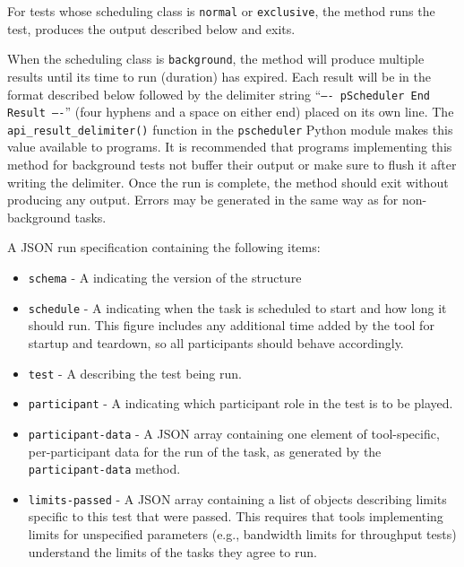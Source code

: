 \documentclass[10pt,titlepage]{article}
\begin{document}
For tests whose scheduling class is {\tt normal} or {\tt exclusive},
the method runs the test, produces the output described below and exits.

When the scheduling class is {\tt background}, the method will produce
multiple results until its time to run (duration) has expired.  Each
result will be in the format described below followed by the delimiter
string ``{\tt ---- pScheduler End Result ----}'' (four hyphens and a
space on either end) placed on its own line.  The {\tt
  api_result_delimiter()} function in the {\tt pscheduler} Python
module makes this value available to programs.  It is recommended that
programs implementing this method for background tests not buffer
their output or make sure to flush it after writing the delimiter.
Once the run is complete, the method should exit without producing any
output.  Errors may be generated in the same way as for non-background
tasks.



 A JSON run specification containing the following items:
\begin{itemize}

\item{\tt schema} - A  indicating the version of the structure

\item{\tt schedule} - A  indicating when the
  task is scheduled to start and how long it should run.  This figure
  includes any additional time added by the tool for startup and
  teardown, so all participants should behave accordingly.

\item{\tt test} - A  describing the test
  being run.

\item{\tt participant} - A  indicating which
  participant role in the test is to be played.

\item{\tt participant-data} - A JSON array containing one element of
  tool-specific, per-participant data for the run of the task, as
  generated by the {\tt participant-data} method.

\item{\tt limits-passed} - A JSON array containing a list of objects
  describing limits specific to this test that were passed.  This
  requires that tools implementing limits for unspecified parameters
  (e.g., bandwidth limits for throughput tests) understand the limits
  of the tasks they agree to run.


\end{itemize}
\end{document}
